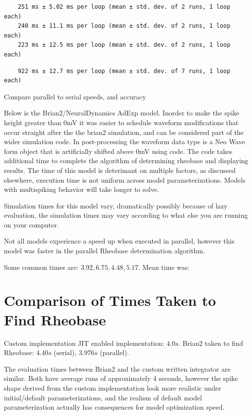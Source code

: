 \begin{Verbatim}
    251 ms ± 5.02 ms per loop (mean ± std. dev. of 2 runs, 1 loop each)
    240 ms ± 11.1 ms per loop (mean ± std. dev. of 2 runs, 1 loop each)
    223 ms ± 12.5 ms per loop (mean ± std. dev. of 2 runs, 1 loop each)
\end{Verbatim}

\begin{Verbatim}
    922 ms ± 12.7 ms per loop (mean ± std. dev. of 7 runs, 1 loop each)
\end{Verbatim}

    Compare parallel to serial speeds, and accuracy

Below is the Brian2/NeuralDynamics AdExp model. Inorder to make the spike height greater than 0mV it was easier to schedule waveform
modifications that occur straight after the the brian2 simulation, and
can be considered part of the wider simulation code. In post-processing
the waveform data type is a Neo Wave form object that is artificially
shifted above 0mV using code. The code takes additional time to complete
the algorithm of determining rheobase and displaying results. The time
of this model is deterimant on multiple factors, as discussed elsewhere,
execution time is not uniform across model parameterizations. Models
with multispiking behavior will take longer to solve.

Simulation times for this model vary, dramatically possibly because of
lazy evaluation, the simulation times may vary according to what else
you are running on your computer.

Not all models experience a speed up when executed in parallel, however
this model was faster in the parallel Rheobase determination algorithm.

Some common times are: $3.92,6.75,4.48,5.17$. Mean time was:

\section{Comparison of Times Taken to Find Rheobase}
Custom implementation JIT enabled implementation: $4.0s$. 
Brian2 taken to find Rheobase: $4.40s$ (serial), $3.976s$ (parallel).

The evaluation times between Brian2 and the custom written
integrator are similar. Both have average runs of approximately 4 seconds, however the spike shape derived from the custom implementation look more realistic
under initial/default parameterizations, and the realism of default model parameterization actually has consequences for model optimization speed.


